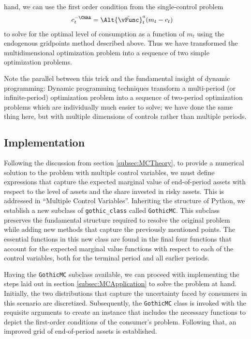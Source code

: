 \documentclass[titlepage, headings=optiontotocandhead]{\econtex}
\begin{document}
hand, we can use the first order condition from the single-control
problem
\begin{equation*}\begin{gathered}\begin{aligned}
      {c}_{t}^{-\CRRA}  & = \Alt{\Opt{\vFunc}}_{t}^{{a}}({m}_{t}-{c}_{t})
    \end{aligned}\end{gathered}\end{equation*}
to solve for the optimal level of consumption as a function of
${m}_{t}$ using the endogenous gridpoints method described above.  Thus we have transformed the multidimensional optimization
problem into a sequence of two simple optimization problems.

Note the parallel between this trick and the fundamental insight of
dynamic programming: Dynamic programming techniques transform a
multi-period (or infinite-period) optimization problem into a sequence
of two-period optimization problems which are individually much easier
to solve; we have done the same thing here, but with multiple dimensions
of controls rather than multiple periods.

\hypertarget{Implementation}{}
\subsection{Implementation}

Following the discussion from section \ref{subsec:MCTheory}, to provide a numerical solution to the problem
with multiple control variables, we must define expressions that capture the expected marginal value of end-of-period
assets with respect to the level of assets and the share invested in risky assets. This is addressed in ``Multiple Control Variables''. Inheriting the structure of Python, we establish a new subclass of \texttt{gothic\_class} called \texttt{GothicMC}. This subclass preserves the fundamental structure required to resolve the original problem while adding new methods that capture the previously mentioned points. The essential functions in this new class are found in the final four functions that account for the expected marginal value functions with respect to each of the control variables, both for the terminal period and all earlier periods.

Having the \texttt{GothicMC} subclass available, we can proceed with implementing the steps laid out in section \ref{subsec:MCApplication} to solve the problem at hand. Initially, the two distributions that capture the uncertainty faced by consumers in this scenario are discretized. Subsequently, the \texttt{GothicMC} class is invoked with the requisite arguments to create an instance that includes the necessary functions to depict the first-order conditions of the consumer's problem. Following that, an improved grid of end-of-period assets is established.
\end{document}

